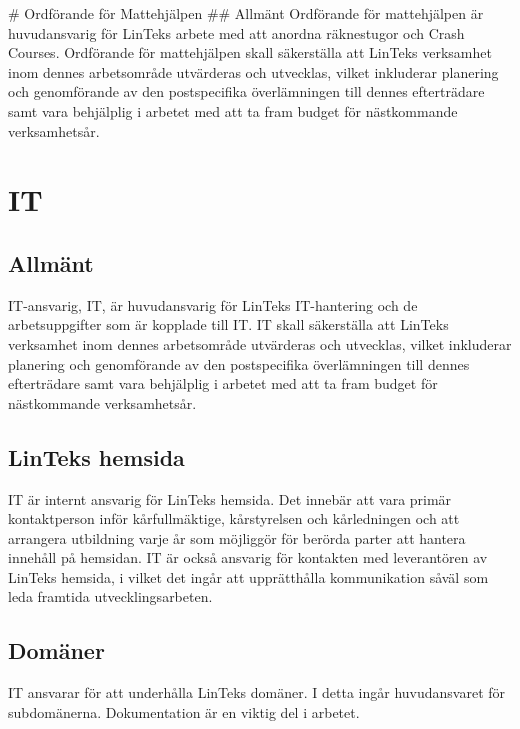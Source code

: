 \# Ordförande för Mattehjälpen \#\# Allmänt Ordförande för mattehjälpen
är huvudansvarig för LinTeks arbete med att anordna räknestugor och
Crash Courses. Ordförande för mattehjälpen skall säkerställa att LinTeks
verksamhet inom dennes arbetsområde utvärderas och utvecklas, vilket
inkluderar planering och genomförande av den postspecifika överlämningen
till dennes efterträdare samt vara behjälplig i arbetet med att ta fram
budget för nästkommande verksamhetsår.

\hypertarget{it}{%
\section{IT}\label{it}}

\hypertarget{allmuxe4nt-11}{%
\subsection{Allmänt}\label{allmuxe4nt-11}}

IT-ansvarig, IT, är huvudansvarig för LinTeks IT-hantering och de
arbetsuppgifter som är kopplade till IT. IT skall säkerställa att
LinTeks verksamhet inom dennes arbetsområde utvärderas och utvecklas,
vilket inkluderar planering och genomförande av den postspecifika
överlämningen till dennes efterträdare samt vara behjälplig i arbetet
med att ta fram budget för nästkommande verksamhetsår.

\hypertarget{linteks-hemsida}{%
\subsection{LinTeks hemsida}\label{linteks-hemsida}}

IT är internt ansvarig för LinTeks hemsida. Det innebär att vara primär
kontaktperson inför kårfullmäktige, kårstyrelsen och kårledningen och
att arrangera utbildning varje år som möjliggör för berörda parter att
hantera innehåll på hemsidan. IT är också ansvarig för kontakten med
leverantören av LinTeks hemsida, i vilket det ingår att upprätthålla
kommunikation såväl som leda framtida utvecklingsarbeten.

\hypertarget{domuxe4ner}{%
\subsection{Domäner}\label{domuxe4ner}}

IT ansvarar för att underhålla LinTeks domäner. I detta ingår
huvudansvaret för subdomänerna. Dokumentation är en viktig del i
arbetet.

